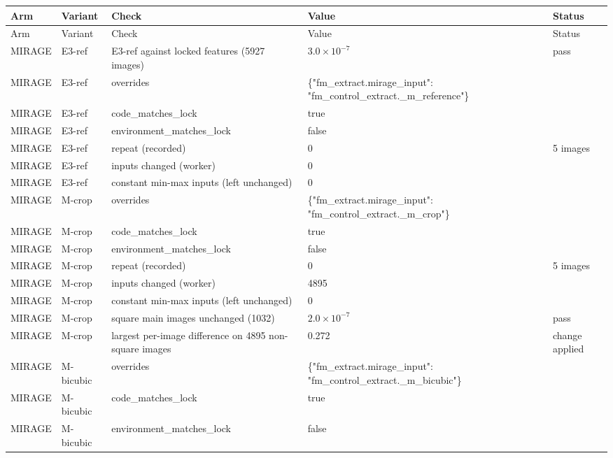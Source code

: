 \begin{longtable}{@{}llp{5.8cm}p{3.7cm}p{3.5cm}@{}}
\toprule
Arm & Variant & Check & Value & Status \\
\midrule
\endfirsthead
\toprule
Arm & Variant & Check & Value & Status \\
\midrule
\endhead
\bottomrule
\endfoot
\bottomrule
\endlastfoot
MIRAGE & E3-ref & E3-ref against locked features (5927 images) & $3.0\times10^{-7}$ & pass \\
MIRAGE & E3-ref & overrides & \{"fm\_extract.mirage\_input": "fm\_control\_extract.\_m\_reference"\} &  \\
MIRAGE & E3-ref & code\_matches\_lock & true &  \\
MIRAGE & E3-ref & environment\_matches\_lock & false &  \\
MIRAGE & E3-ref & repeat (recorded) & 0 & 5 images \\
MIRAGE & E3-ref & inputs changed (worker) & 0 &  \\
MIRAGE & E3-ref & constant min-max inputs (left unchanged) & 0 &  \\
MIRAGE & M-crop & overrides & \{"fm\_extract.mirage\_input": "fm\_control\_extract.\_m\_crop"\} &  \\
MIRAGE & M-crop & code\_matches\_lock & true &  \\
MIRAGE & M-crop & environment\_matches\_lock & false &  \\
MIRAGE & M-crop & repeat (recorded) & 0 & 5 images \\
MIRAGE & M-crop & inputs changed (worker) & 4895 &  \\
MIRAGE & M-crop & constant min-max inputs (left unchanged) & 0 &  \\
MIRAGE & M-crop & square main images unchanged (1032) & $2.0\times10^{-7}$ & pass \\
MIRAGE & M-crop & largest per-image difference on 4895 non-square images & 0.272 & change applied \\
MIRAGE & M-bicubic & overrides & \{"fm\_extract.mirage\_input": "fm\_control\_extract.\_m\_bicubic"\} &  \\
MIRAGE & M-bicubic & code\_matches\_lock & true &  \\
MIRAGE & M-bicubic & environment\_matches\_lock & false &  \\

\end{longtable}
